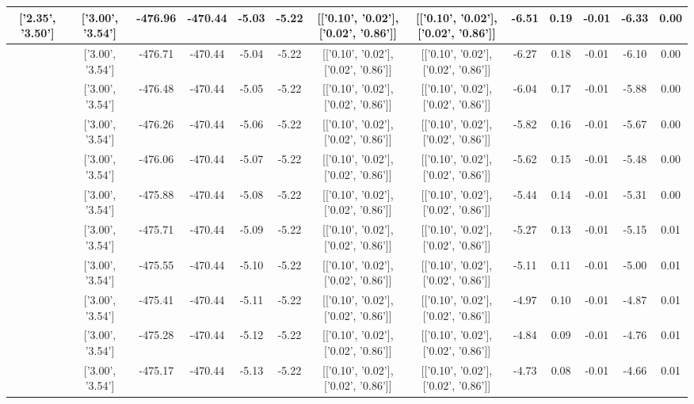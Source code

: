 \begin{table}[htbp]
\begin{adjustbox}{angle=90}
\begin{tabular}{|c|c|c|c|c|c|c|c|c|c|c|c|c|}
 ['2.35', '3.50'] & ['3.00', '3.54'] & -476.96 & -470.44 & -5.03 & -5.22 & [['0.10', '0.02'], ['0.02', '0.86']] & [['0.10', '0.02'], ['0.02', '0.86']] & -6.51 & 0.19 & -0.01 & -6.33 & 0.00\\ \hline
 ['2.39', '3.50'] & ['3.00', '3.54'] & -476.71 & -470.44 & -5.04 & -5.22 & [['0.10', '0.02'], ['0.02', '0.86']] & [['0.10', '0.02'], ['0.02', '0.86']] & -6.27 & 0.18 & -0.01 & -6.10 & 0.00\\ \hline
 ['2.43', '3.50'] & ['3.00', '3.54'] & -476.48 & -470.44 & -5.05 & -5.22 & [['0.10', '0.02'], ['0.02', '0.86']] & [['0.10', '0.02'], ['0.02', '0.86']] & -6.04 & 0.17 & -0.01 & -5.88 & 0.00\\ \hline
 ['2.47', '3.50'] & ['3.00', '3.54'] & -476.26 & -470.44 & -5.06 & -5.22 & [['0.10', '0.02'], ['0.02', '0.86']] & [['0.10', '0.02'], ['0.02', '0.86']] & -5.82 & 0.16 & -0.01 & -5.67 & 0.00\\ \hline
 ['2.50', '3.51'] & ['3.00', '3.54'] & -476.06 & -470.44 & -5.07 & -5.22 & [['0.10', '0.02'], ['0.02', '0.86']] & [['0.10', '0.02'], ['0.02', '0.86']] & -5.62 & 0.15 & -0.01 & -5.48 & 0.00\\ \hline
 ['2.54', '3.51'] & ['3.00', '3.54'] & -475.88 & -470.44 & -5.08 & -5.22 & [['0.10', '0.02'], ['0.02', '0.86']] & [['0.10', '0.02'], ['0.02', '0.86']] & -5.44 & 0.14 & -0.01 & -5.31 & 0.00\\ \hline
 ['2.58', '3.51'] & ['3.00', '3.54'] & -475.71 & -470.44 & -5.09 & -5.22 & [['0.10', '0.02'], ['0.02', '0.86']] & [['0.10', '0.02'], ['0.02', '0.86']] & -5.27 & 0.13 & -0.01 & -5.15 & 0.01\\ \hline
 ['2.62', '3.51'] & ['3.00', '3.54'] & -475.55 & -470.44 & -5.10 & -5.22 & [['0.10', '0.02'], ['0.02', '0.86']] & [['0.10', '0.02'], ['0.02', '0.86']] & -5.11 & 0.11 & -0.01 & -5.00 & 0.01\\ \hline
 ['2.66', '3.52'] & ['3.00', '3.54'] & -475.41 & -470.44 & -5.11 & -5.22 & [['0.10', '0.02'], ['0.02', '0.86']] & [['0.10', '0.02'], ['0.02', '0.86']] & -4.97 & 0.10 & -0.01 & -4.87 & 0.01\\ \hline
 ['2.69', '3.52'] & ['3.00', '3.54'] & -475.28 & -470.44 & -5.12 & -5.22 & [['0.10', '0.02'], ['0.02', '0.86']] & [['0.10', '0.02'], ['0.02', '0.86']] & -4.84 & 0.09 & -0.01 & -4.76 & 0.01\\ \hline
 ['2.73', '3.52'] & ['3.00', '3.54'] & -475.17 & -470.44 & -5.13 & -5.22 & [['0.10', '0.02'], ['0.02', '0.86']] & [['0.10', '0.02'], ['0.02', '0.86']] & -4.73 & 0.08 & -0.01 & -4.66 & 0.01\\ \hline

\end{tabular}
\end{adjustbox}
\end{table}
